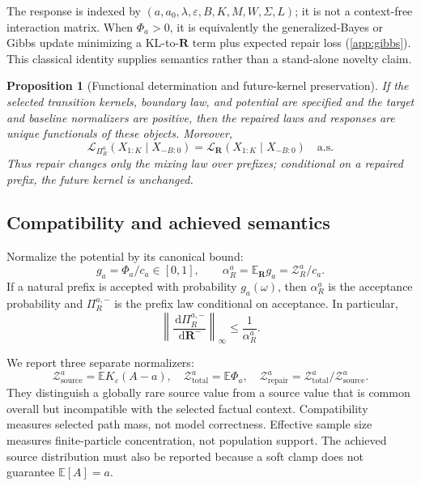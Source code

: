 \documentclass{article}
\newcommand{\E}{\mathbb E}
\newcommand{\Law}{\mathcal L}
\newcommand{\Z}{\mathcal Z}
\newcommand{\PathR}{\mathbf R}
\newcommand{\eps}{\varepsilon}
\newcommand{\dd}{\,\mathrm d}
\newtheorem{proposition}[definition]{Proposition}
\theoremstyle{remark}
\begin{document}
The response is indexed by
\((a,a_0,\lambda,\eps,B,K,M,W,\Sigma,L)\); it is not a context-free
interaction matrix. When \(\Phi_a>0\), it is equivalently the generalized-Bayes
or Gibbs update minimizing a KL-to-\(\PathR\) term plus expected repair loss
(\cref{app:gibbs}). This classical identity supplies semantics rather than a
stand-alone novelty claim.

\begin{proposition}[Functional determination and future-kernel preservation]
\label{prop:functional-future}
If the selected transition kernels, boundary law, and potential are specified
and the target and baseline normalizers are positive, then the repaired laws
and responses are unique functionals of these objects. Moreover,
\begin{equation}
  \Law_{\Pi_R^a}(X_{1:K}\mid X_{-B:0})
  =
  \Law_{\PathR}(X_{1:K}\mid X_{-B:0})
  \quad\text{a.s.}
  \label{eq:future-preservation}
\end{equation}
Thus repair changes only the mixing law over prefixes; conditional on a
repaired prefix, the future kernel is unchanged.
\end{proposition}

\subsection{Compatibility and achieved semantics}

Normalize the potential by its canonical bound:
\begin{equation}
  g_a=\Phi_a/c_a\in[0,1],
  \qquad
  \alpha_R^a=\E_{\PathR}g_a=\Z_R^a/c_a.
  \label{eq:compatibility}
\end{equation}
If a natural prefix is accepted with probability \(g_a(\omega)\), then
\(\alpha_R^a\) is the acceptance probability and \(\Pi_R^{a,-}\) is the prefix
law conditional on acceptance. In particular,
\begin{equation}
  \left\|
  \frac{\dd\Pi_R^{a,-}}{\dd\PathR^-}
  \right\|_\infty
  \leq \frac{1}{\alpha_R^a}.
  \label{eq:density-ratio}
\end{equation}

We report three separate normalizers:
\[
  \Z_{\mathrm{source}}^a=\E K_\eps(A-a),\quad
  \Z_{\mathrm{total}}^a=\E\Phi_a,\quad
  \Z_{\mathrm{repair}}^a=
  \Z_{\mathrm{total}}^a/\Z_{\mathrm{source}}^a.
\]
They distinguish a globally rare source value from a source value that is
common overall but incompatible with the selected factual context.
Compatibility measures selected path mass, not model correctness. Effective
sample size measures finite-particle concentration, not population support.
The achieved source distribution must also be reported because a soft clamp
does not guarantee \(\E[A]=a\).
\end{document}
